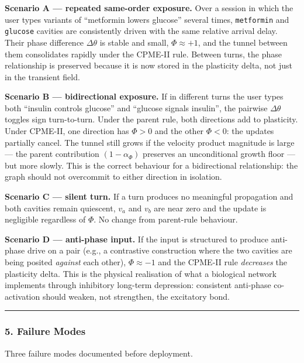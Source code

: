 \documentclass[
  11pt,
  a4paper,
]{article}
\begin{document}
\textbf{Scenario A --- repeated same-order exposure.} Over a session in
which the user types variants of ``metformin lowers glucose'' several
times, \texttt{metformin} and \texttt{glucose} cavities are consistently
driven with the same relative arrival delay. Their phase difference
\(\Delta \theta\) is stable and small, \(\Phi \approx +1\), and the
tunnel between them consolidates rapidly under the CPME-II rule. Between
turns, the phase relationship is preserved because it is now stored in
the plasticity delta, not just in the transient field.

\textbf{Scenario B --- bidirectional exposure.} If in different turns
the user types both ``insulin controls glucose'' and ``glucose signals
insulin'', the pairwise \(\Delta \theta\) toggles sign turn-to-turn.
Under the parent rule, both directions add to plasticity. Under CPME-II,
one direction has \(\Phi > 0\) and the other \(\Phi < 0\): the updates
partially cancel. The tunnel still grows if the velocity product
magnitude is large --- the parent contribution \((1 - \alpha_\Phi)\)
preserves an unconditional growth floor --- but more slowly. This is the
correct behaviour for a bidirectional relationship: the graph should not
overcommit to either direction in isolation.

\textbf{Scenario C --- silent turn.} If a turn produces no meaningful
propagation and both cavities remain quiescent, \(v_a\) and \(v_b\) are
near zero and the update is negligible regardless of \(\Phi\). No change
from parent-rule behaviour.

\textbf{Scenario D --- anti-phase input.} If the input is structured to
produce anti-phase drive on a pair (e.g., a contrastive construction
where the two cavities are being posited \emph{against} each other),
\(\Phi \approx -1\) and the CPME-II rule \emph{decreases} the plasticity
delta. This is the physical realisation of what a biological network
implements through inhibitory long-term depression: consistent
anti-phase co-activation should weaken, not strengthen, the excitatory
bond.

\begin{center}\rule{0.5\linewidth}{0.5pt}\end{center}

\subsubsection{5. Failure Modes}\label{failure-modes-2}

Three failure modes documented before deployment.
\end{document}
